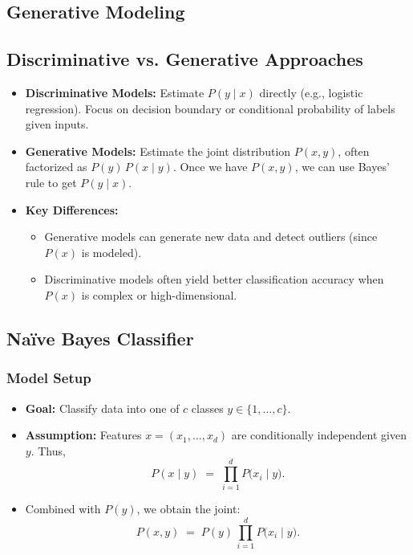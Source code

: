 \documentclass[twocolumn]{article}
\begin{document}
\begin{spacing}{1}
\section{Generative Modeling}

\subsection{Discriminative vs. Generative Approaches}
\begin{itemize}
    \item \textbf{Discriminative Models:} Estimate $P(y \mid x)$ directly (e.g., logistic regression). Focus on decision boundary or conditional probability of labels given inputs.
    \item \textbf{Generative Models:} Estimate the joint distribution $P(x, y)$, often factorized as $P(y) \, P(x \mid y)$. Once we have $P(x,y)$, we can use Bayes’ rule to get $P(y \mid x)$.
    \item \textbf{Key Differences:}
    \begin{itemize}
        \item Generative models can generate new data and detect outliers (since $P(x)$ is modeled).
        \item Discriminative models often yield better classification accuracy when $P(x)$ is complex or high-dimensional.
    \end{itemize}
\end{itemize}

\subsection{Na\"ive Bayes Classifier}
\subsubsection{Model Setup}
\begin{itemize}
    \item \textbf{Goal:} Classify data into one of $c$ classes $y \in \{1, \dots, c\}$.
    \item \textbf{Assumption:} Features $x = (x_1, \ldots, x_d)$ are conditionally independent given $y$. Thus,
    \[
        P(x \mid y) 
        \;=\; \prod_{i=1}^d P\bigl(x_i \mid y\bigr).
    \]
    \item Combined with $P(y)$, we obtain the joint:
    \[
        P(x, y) \;=\; P(y)\,\prod_{i=1}^d P\bigl(x_i \mid y\bigr).
    \]
\end{itemize}


\end{spacing}
\end{document}
